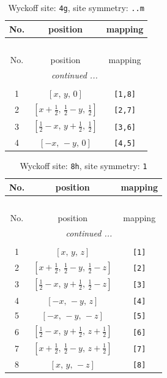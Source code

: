 \documentclass[fleqn,8pt]{jsarticle}
\begin{document}
\renewcommand{\arraystretch}{1.2}
\begin{longtable}{ccc}
\caption{Wyckoff site: {\tt 4g}, site symmetry: {\tt ..m}}
 \\
 \hline \hline
No. & position & mapping \\ \hline \endfirsthead

\multicolumn{2}{l}{\tablename\ \thetable{}} \\
 \hline \hline
No. & position & mapping \\ \hline \endhead

 \hline \hline
\multicolumn{2}{r}{\footnotesize\it continued ...} \\ \endfoot

 \hline \hline
\multicolumn{2}{r}{} \\ \endlastfoot

1 & $\left[ x,\, y,\, 0 \right]$ & {\tt [1,8]} \\ \hline
2 & $\left[ x + \frac{1}{2},\, \frac{1}{2} - y,\, \frac{1}{2} \right]$ & {\tt [2,7]} \\ \hline
3 & $\left[ \frac{1}{2} - x,\, y + \frac{1}{2},\, \frac{1}{2} \right]$ & {\tt [3,6]} \\ \hline
4 & $\left[ - x,\, - y,\, 0 \right]$ & {\tt [4,5]} \\
\end{longtable}
\renewcommand{\arraystretch}{1.2}
\begin{longtable}{ccc}
\caption{Wyckoff site: {\tt 8h}, site symmetry: {\tt 1}}
 \\
 \hline \hline
No. & position & mapping \\ \hline \endfirsthead

\multicolumn{2}{l}{\tablename\ \thetable{}} \\
 \hline \hline
No. & position & mapping \\ \hline \endhead

 \hline \hline
\multicolumn{2}{r}{\footnotesize\it continued ...} \\ \endfoot

 \hline \hline
\multicolumn{2}{r}{} \\ \endlastfoot

1 & $\left[ x,\, y,\, z \right]$ & {\tt [1]} \\ \hline
2 & $\left[ x + \frac{1}{2},\, \frac{1}{2} - y,\, \frac{1}{2} - z \right]$ & {\tt [2]} \\ \hline
3 & $\left[ \frac{1}{2} - x,\, y + \frac{1}{2},\, \frac{1}{2} - z \right]$ & {\tt [3]} \\ \hline
4 & $\left[ - x,\, - y,\, z \right]$ & {\tt [4]} \\ \hline
5 & $\left[ - x,\, - y,\, - z \right]$ & {\tt [5]} \\ \hline
6 & $\left[ \frac{1}{2} - x,\, y + \frac{1}{2},\, z + \frac{1}{2} \right]$ & {\tt [6]} \\ \hline
7 & $\left[ x + \frac{1}{2},\, \frac{1}{2} - y,\, z + \frac{1}{2} \right]$ & {\tt [7]} \\ \hline
8 & $\left[ x,\, y,\, - z \right]$ & {\tt [8]} \\
\end{longtable}
\end{document}
